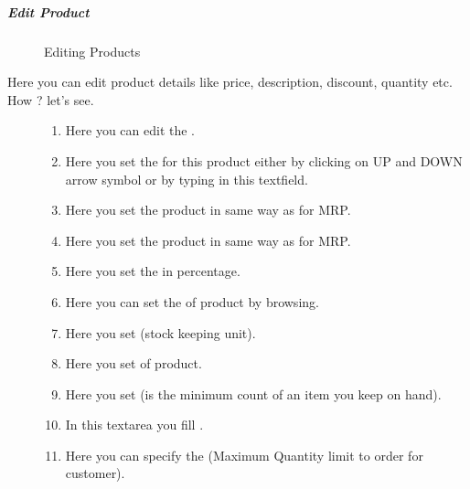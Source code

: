 \documentclass[a4paper,10pt,english]{report}
\begin{document}
\subparagraph{Edit Product}
\label{\detokenize{listing:edit-product}}
\begin{figure}[htbp]
\centering
\capstart

\noindent{}
\caption{Editing Products}\label{\detokenize{listing:id9}}\label{\detokenize{listing:id3}}\end{figure}
\begin{description}
\item[{Here you can edit product details like price, description, discount, quantity etc. How ? let’s see.}] \leavevmode\begin{enumerate}
\def\theenumi{\arabic{enumi}}
\def\labelenumi{\theenumi .}
\makeatletter\def\p@enumii{\p@enumi \theenumi .}\makeatother
\item {} 
Here you can edit the .

\item {} 
Here you set the  for this product either by clicking on UP and DOWN arrow symbol or by typing in this textfield.

\item {} 
Here you set the product  in same way as for MRP.

\item {} 
Here you set the product  in same way as for MRP.

\item {} 
Here you set the  in percentage.

\item {} 
Here you can set the  of product by browsing.

\item {} 
Here you set  (stock keeping unit).

\item {} 
Here you set  of product.

\item {} 
Here you set  (is the minimum count of an item you keep on hand).

\item {} 
In this textarea you fill .

\item {} 
Here you can specify the  (Maximum Quantity limit to order for customer).


\end{enumerate}
\end{description}
\end{document}
